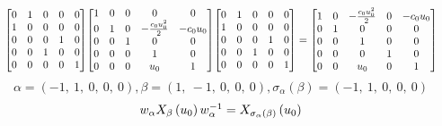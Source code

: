 \documentclass[11pt]{article}
\theoremstyle{definition}
\begin{document}
\[
\scaletoalign{\textwidth}{{\left[\begin{matrix}0 & 1 & 0 & 0 & 0\\1 & 0 & 0 & 0 & 0\\0 & 0 & 0 & 1 & 0\\0 & 0 & 1 & 0 & 0\\0 & 0 & 0 & 0 & 1\end{matrix}\right]} {\left[\begin{matrix}1 & 0 & 0 & 0 & 0\\0 & 1 & 0 & - \frac{c_{0} u_{0}^{2}}{2} & - c_{0} u_{0}\\0 & 0 & 1 & 0 & 0\\0 & 0 & 0 & 1 & 0\\0 & 0 & 0 & u_{0} & 1\end{matrix}\right]} {\left[\begin{matrix}0 & 1 & 0 & 0 & 0\\1 & 0 & 0 & 0 & 0\\0 & 0 & 0 & 1 & 0\\0 & 0 & 1 & 0 & 0\\0 & 0 & 0 & 0 & 1\end{matrix}\right]} = {\left[\begin{matrix}1 & 0 & - \frac{c_{0} u_{0}^{2}}{2} & 0 & - c_{0} u_{0}\\0 & 1 & 0 & 0 & 0\\0 & 0 & 1 & 0 & 0\\0 & 0 & 0 & 1 & 0\\0 & 0 & u_{0} & 0 & 1\end{matrix}\right]}}
\]
\[
\alpha = \left( -1, \  1, \  0, \  0, \  0\right), \beta = \left( 1, \  -1, \  0, \  0, \  0\right), \sigma_{\alpha}(\beta) = \left( -1, \  1, \  0, \  0, \  0\right)
\]
\[
\scaletoalign{\textwidth}{w_{\alpha} X_{\beta}\left(u_{0}\right) w_{\alpha}^{-1} = X_{\sigma_{\alpha}\left(\beta\right)}\left(u_{0}\right)}
\]
\end{document}
